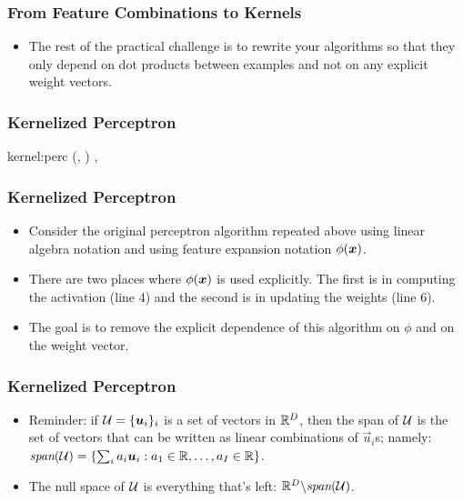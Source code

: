 \documentclass[trans]{beamer}
\begin{document}
\begin{frame}
  \frametitle{From Feature Combinations to Kernels}
\begin{itemize}
\item 
The rest of the practical challenge is to rewrite your algorithms so
that they only depend on dot products between examples and not on any
explicit weight vectors.
\end{itemize}
\end{frame}
\begin{frame}
  \frametitle{Kernelized Perceptron}
\newalgorithm%
  {kernel:perc}%
  {(, )}
  {
\ENDIF
\ENDFOR
\ENDFOR
\RETURN \VAR{$\vw$}, 
}
\end{frame}
\begin{frame}
  \frametitle{Kernelized Perceptron}
\begin{itemize}
\item 
Consider the original perceptron algorithm 
 repeated above
using linear algebra notation and using feature expansion notation
$\phi({\boldsymbol{x}})$. 
\item There are two places where
$\phi({\boldsymbol{x}})$ is used explicitly.  The first is in computing the
activation (line 4) and the second is in updating the weights (line
6).  
\item The goal is to remove the explicit dependence of this algorithm
on $\phi$ and on the weight vector.
\end{itemize}
\end{frame}
\begin{frame}
  \frametitle{Kernelized Perceptron}
\begin{itemize}
\item 
  Reminder: if $\mathcal{U} = \{ \boldsymbol{u}_i \}_i$ is a set of vectors in $\mathbb{R}^D$, then
  the span of $\mathcal{U}$ is the set of vectors that can be written as
  linear combinations of $\vec u_i$s; namely: $\textit{span}(\mathcal{U}) = \{
  \sum_i a_i \boldsymbol{u}_i : a_1 \in \mathbb{R}, \dots, a_I \in \mathbb{R} \}$.
\item 
  The null space of $\mathcal{U}$ is everything that's left: $\mathbb{R}^D \backslash
  \textit{span}(\mathcal{U})$.
\end{itemize}
\end{frame}
\end{document}
